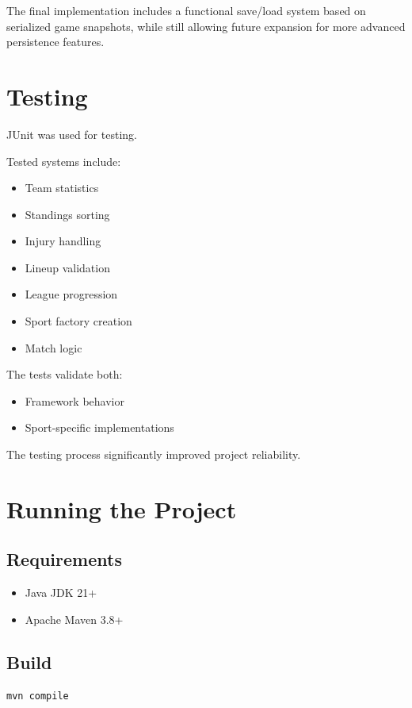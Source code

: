 \documentclass[11pt,a4paper]{article}
\begin{document}
The final implementation includes a functional save/load system based on serialized game snapshots, while still allowing future expansion for more advanced persistence features.

\section{Testing}

JUnit was used for testing.

Tested systems include:
\begin{itemize}
\item Team statistics
\item Standings sorting
\item Injury handling
\item Lineup validation
\item League progression
\item Sport factory creation
\item Match logic
\end{itemize}

The tests validate both:
\begin{itemize}
\item Framework behavior
\item Sport-specific implementations
\end{itemize}

The testing process significantly improved project reliability.

\section{Running the Project}

\subsection*{Requirements}

\begin{itemize}
\item Java JDK 21+
\item Apache Maven 3.8+
\end{itemize}

\subsection*{Build}

\begin{verbatim}
mvn compile
\end{verbatim}
\end{document}

